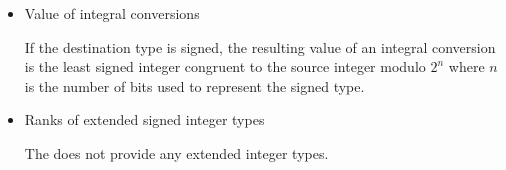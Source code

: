 
\begin{itemize}

\item Value of integral conversions 

If the destination type is signed, the resulting value of an integral conversion is the least signed integer congruent to the source integer modulo $2^n$ where $n$ is the number of bits used to represent the signed type.

\item Ranks of extended signed integer types 

The \ecs{} does not provide any extended integer types.

\end{itemize}


